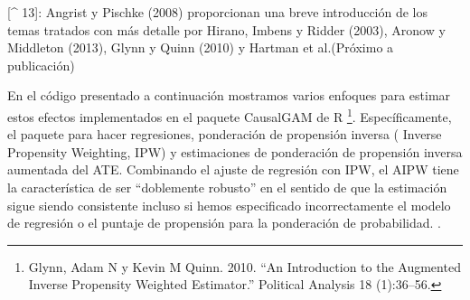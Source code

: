 \documentclass[
]{article}
\begin{document}
{[}\^{} 13{]}: Angrist y Pischke (2008) proporcionan una breve
introducción de los temas tratados con más detalle por Hirano, Imbens y
Ridder (2003), Aronow y Middleton (2013), Glynn y Quinn (2010) y Hartman
et al.(Próximo a publicación)

En el código presentado a continuación mostramos varios enfoques para
estimar estos efectos implementados en el paquete CausalGAM de R
\footnote{Glynn, Adam N y Kevin M Quinn. 2010. ``An Introduction to the
  Augmented Inverse Propensity Weighted Estimator.'' Political Analysis
  18 (1):36--56.}. Específicamente, el paquete para hacer regresiones,
ponderación de propensión inversa ( Inverse Propensity Weighting, IPW) y
estimaciones de ponderación de propensión inversa aumentada del ATE.
Combinando el ajuste de regresión con IPW, el AIPW tiene la
característica de ser ``doblemente robusto'' en el sentido de que la
estimación sigue siendo consistente incluso si hemos especificado
incorrectamente el modelo de regresión o el puntaje de propensión para
la ponderación de probabilidad. .
\end{document}
